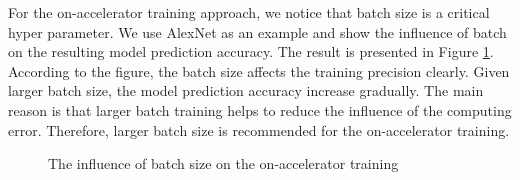 For the on-accelerator training approach, we notice that batch size is 
a critical hyper parameter. We use AlexNet as an example and show the influence of batch on the resulting model 
prediction accuracy. The result is presented in Figure \ref{fig:batch}.
According to the figure, the batch size affects the training precision clearly.
Given larger batch size, the model prediction accuracy 
increase gradually. The main reason is that larger batch training helps to 
reduce the influence of the computing error. Therefore, larger batch size is 
recommended for the on-accelerator training.

\begin{figure}
        \caption{The influence of batch size on the on-accelerator training}
        \label{fig:batch}
\end{figure}
